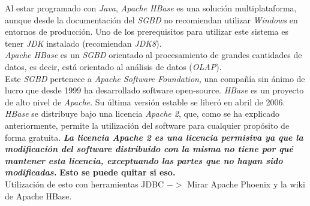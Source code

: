 \documentclass[11pt,a4paper]{article}
\begin{document}
Al estar programado con \emph{Java}, \emph{Apache HBase} es una solución multiplataforma, aunque desde la documentación del \emph{SGBD} no recomiendan utilizar \emph{Windows} en entornos de producción. Uno de los prerequisitos para utilizar este sistema es tener \emph{JDK} instalado (recomiendan \emph{JDK8}). \cite{AP:6}\\

\emph{Apache HBase} es un \emph{SGBD} orientado al procesamiento de grandes cantidades de datos, es decir, está orientado al análisis de datos (\emph{OLAP}).\\

Este \emph{SGBD} pertenece a \emph{Apache Software Foundation}, una compañía sin ánimo de lucro que desde 1999 ha desarrollado software open-source. \emph{HBase} es un proyecto de alto nivel de \emph{Apache}. Su última versión estable se liberó en abril de 2006. \cite{WIKI:8} \\

\emph{HBase} se distribuye bajo una licencia \emph{Apache 2}, que, como se ha explicado anteriormente, permite la utilización del software para cualquier propósito de forma gratuita. \textbf{\textit{La licencia \emph{Apache 2} es una licencia permisiva ya que la modificación del software distribuido con la misma no tiene por qué mantener esta licencia, exceptuando las partes que no hayan sido modificadas.}} \textbf{{\Large Esto se puede quitar si eso}.} \cite{WIKI:6}\\

Utilización de esto con herramientas JDBC $->$  Mirar Apache Phoenix y la wiki de Apache HBase.\\


\newpage


\end{document}

